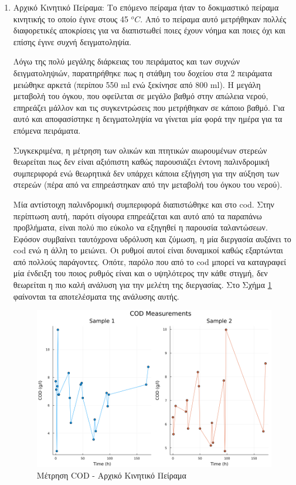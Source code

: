 \documentclass[11pt]{report}
\begin{document}
\begin{enumerate}
\item Αρχικό Κινητικό Πείραμα:
\label{sec:orgb131c0c}
Το επόμενο πείραμα ήταν το δοκιμαστικό πείραμα κινητικής το οποίο έγινε στους 45 \(^oC\). Από το πείραμα αυτό μετρήθηκαν πολλές διαφορετικές αποκρίσεις για να διαπιστωθεί ποιες έχουν νόημα και ποιες όχι και επίσης έγινε συχνή δειγματοληψία.

Λόγω της πολύ μεγάλης διάρκειας του πειράματος και των συχνών δειγματοληψιών, παρατηρήθηκε πως η στάθμη του δοχείου στα 2 πειράματα μειώθηκε αρκετά (περίπου 550 ml ενώ ξεκίνησε από 800 ml). Η μεγάλη μεταβολή του όγκου, που οφείλεται σε μεγάλο βαθμό στην απώλεια νερού, επηρεάζει μάλλον και τις συγκεντρώσεις που μετρήθηκαν σε κάποιο βαθμό. Για αυτό και αποφασίστηκε η δειγματοληψία να γίνεται μία φορά την ημέρα για τα επόμενα πειράματα.

Συγκεκριμένα, η μέτρηση των ολικών και πτητικών αιωρουμένων στερεών θεωρείται πως δεν είναι αξιόπιστη καθώς παρουσιάζει έντονη παλινδρομική συμπεριφορά ενώ θεωρητικά δεν υπάρχει κάποια εξήγηση για την αύξηση των στερεών (πέρα από να επηρεάστηκαν από την μεταβολή του όγκου του νερού).

Μία αντίστοιχη παλινδρομική συμπεριφορά διαπιστώθηκε και στο \acrshort{cod}. Στην περίπτωση αυτή, παρότι σίγουρα επηρεάζεται και αυτό από τα παραπάνω προβλήματα, είναι πολύ πιο εύκολο να εξηγηθεί η παρουσία ταλαντώσεων. Εφόσον συμβαίνει ταυτόχρονα υδρόλυση και ζύμωση, η μία διεργασία αυξάνει το \acrshort{cod} ενώ η άλλη το μειώνει. Οι ρυθμοί αυτοί είναι δυναμικοί καθώς εξαρτώνται από πολλούς παράγοντες. Οπότε, παρόλο που από το \acrshort{cod} μπορεί να καταγραφεί μία ένδειξη του ποιος ρυθμός είναι και ο υψηλότερος την κάθε στιγμή, δεν θεωρείται η πιο καλή ανάλυση για την μελέτη της διεργασίας. Στο Σχήμα \ref{fig:org0f3eac0} φαίνονται τα αποτελέσματα της ανάλυσης αυτής.

\begin{figure}[htbp]
\centering
\includegraphics[width=.9\linewidth]{../plots/23_10/cod_scatter_23_10.png}
\caption{\label{fig:org0f3eac0}Μέτρηση COD - Αρχικό Κινητικό Πείραμα}
\end{figure}


\end{enumerate}
\end{document}
